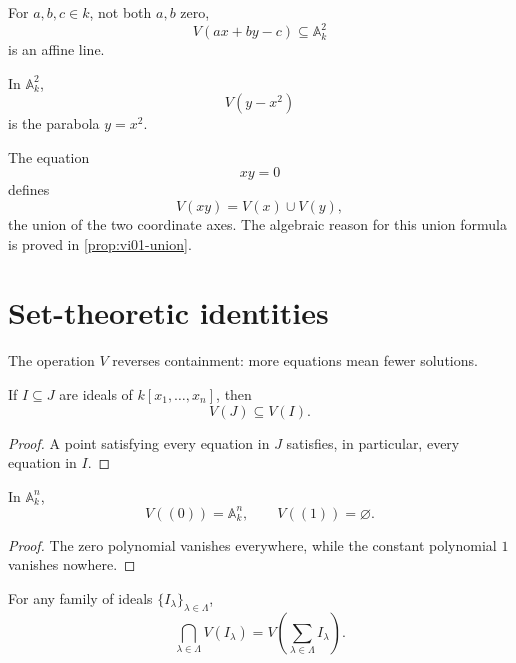 \begin{example}[A line]
For \(a,b,c\in k\), not both \(a,b\) zero,
\[
  V(ax+by-c)\subseteq \mathbb A_k^2
\]
is an affine line.
\end{example}

\begin{example}[A parabola]
In \(\mathbb A_k^2\),
\[
  V(y-x^2)
\]
is the parabola \(y=x^2\).
\end{example}

\begin{example}
The equation
\[
  xy=0
\]
defines
\[
  V(xy)=V(x)\cup V(y),
\]
the union of the two coordinate axes.  The algebraic reason for this union formula is proved
in \cref{prop:vi01-union}.
\end{example}

\section{Set-theoretic identities}
\label{sec:vi01-identities}

The operation \(V\) reverses containment: more equations mean fewer solutions.

\begin{proposition}
\label{prop:vi01-order-reversal-V}
If \(I\subseteq J\) are ideals of \(k[x_1,\dots,x_n]\), then
\[
  V(J)\subseteq V(I).
\]
\end{proposition}

\begin{proof}
A point satisfying every equation in \(J\) satisfies, in particular, every equation in
\(I\).
\end{proof}

\begin{proposition}
\label{prop:vi01-extremes}
In \(\mathbb A_k^n\),
\[
  V((0))=\mathbb A_k^n,
  \qquad
  V((1))=\varnothing.
\]
\end{proposition}

\begin{proof}
The zero polynomial vanishes everywhere, while the constant polynomial \(1\) vanishes
nowhere.
\end{proof}

\begin{proposition}
\label{prop:vi01-intersections}
For any family of ideals \(\{I_\lambda\}_{\lambda\in\Lambda}\),
\[
  \bigcap_{\lambda\in\Lambda} V(I_\lambda)
  =
  V\!\left(\sum_{\lambda\in\Lambda} I_\lambda\right).
\]
\end{proposition}

